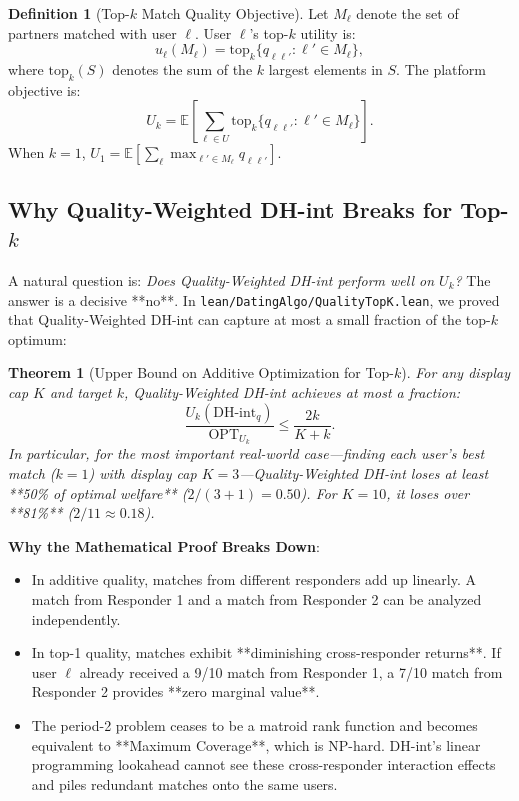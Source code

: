 \documentclass[11pt,letterpaper]{article}
\theoremstyle{definition}
\newtheorem{definition}{Definition}[section]
\theoremstyle{plain}
\newtheorem{theorem}{Theorem}[section]
\theoremstyle{remark}
\begin{document}
\begin{definition}[Top-$k$ Match Quality Objective]
Let $M_\ell$ denote the set of partners matched with user $\ell$. User $\ell$'s top-$k$ utility is:
\begin{equation}
    u_\ell(M_\ell) = \mathrm{top}_k \{ q_{\ell\ell'} : \ell' \in M_\ell \},
\end{equation}
where $\mathrm{top}_k(S)$ denotes the sum of the $k$ largest elements in $S$. The platform objective is:
\begin{equation}
    U_k = \mathbb{E} \left[ \sum_{\ell \in U} \mathrm{top}_k \{ q_{\ell\ell'} : \ell' \in M_\ell \} \right].
\end{equation}
When $k=1$, $U_1 = \mathbb{E}[\sum_\ell \max_{\ell' \in M_\ell} q_{\ell\ell'}]$.
\end{definition}

\subsection{Why Quality-Weighted DH-int Breaks for Top-$k$}
A natural question is: \emph{Does Quality-Weighted DH-int perform well on $U_k$?} The answer is a decisive **no**. In \texttt{lean/DatingAlgo/QualityTopK.lean}, we proved that Quality-Weighted DH-int can capture at most a small fraction of the top-$k$ optimum:

\begin{theorem}[Upper Bound on Additive Optimization for Top-$k$]
For any display cap $K$ and target $k$, Quality-Weighted DH-int achieves at most a fraction:
\begin{equation}
    \frac{U_k(\text{DH-int}_q)}{\mathrm{OPT}_{U_k}} \le \frac{2k}{K + k}.
\end{equation}
In particular, for the most important real-world case—finding each user's best match ($k=1$) with display cap $K=3$—Quality-Weighted DH-int loses at least **50\% of optimal welfare** ($2/(3+1) = 0.50$). For $K=10$, it loses over **81\%** ($2/11 \approx 0.18$).
\end{theorem}

\noindent \textbf{Why the Mathematical Proof Breaks Down}:
\begin{itemize}[leftmargin=2em]
    \item In additive quality, matches from different responders add up linearly. A match from Responder 1 and a match from Responder 2 can be analyzed independently.
    \item In top-1 quality, matches exhibit **diminishing cross-responder returns**. If user $\ell$ already received a 9/10 match from Responder 1, a 7/10 match from Responder 2 provides **zero marginal value**.
    \item The period-2 problem ceases to be a matroid rank function and becomes equivalent to **Maximum Coverage**, which is NP-hard. DH-int's linear programming lookahead cannot see these cross-responder interaction effects and piles redundant matches onto the same users.
\end{itemize}
\end{document}
